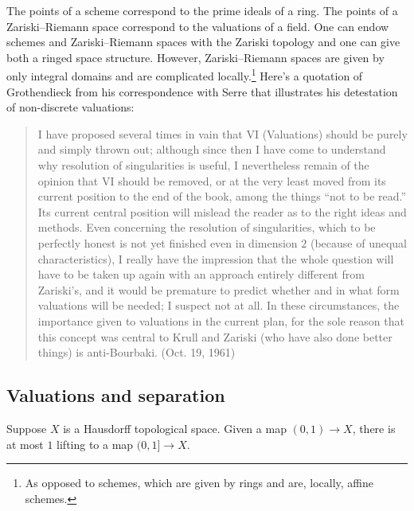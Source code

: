 \documentclass [11 pt, oneside] {article}
\begin{document}
The points of a scheme correspond to the prime ideals of a ring. The points of a Zariski--Riemann space correspond to the valuations of a field. One can endow schemes and Zariski--Riemann spaces with the Zariski topology and one can give both a ringed space structure. However, Zariski--Riemann spaces are given by only integral domains and are complicated locally.\footnote{As opposed to schemes, which are given by rings and are, locally, affine schemes.} Here's a quotation of Grothendieck from his correspondence with Serre that illustrates his detestation of non-discrete valuations:
\begin{quote}
	\small I have proposed several times in vain that VI (Valuations) should be purely and simply thrown out; although since then I have come to understand why resolution of singularities is useful, I nevertheless remain of the opinion that VI should be removed, or at the very least moved from its current position to the end of the book, among the things ``not to be read.'' Its current central position will mislead the reader as to the right ideas and methods. Even concerning the resolution of singularities, which to be perfectly honest is not yet finished even in dimension $2$ (because of unequal characteristics), I really have the impression that the whole question will have to be taken up again with an approach entirely different from Zariski's, and it would be premature to predict whether and in what form valuations will be needed; I suspect not at all. In these circumstances, the importance given to valuations in the current plan, for the sole reason that this concept was central to Krull and Zariski (who have also done better things) is anti-Bourbaki. (Oct. 19, 1961)
\end{quote}

\subsection{Valuations and separation}
Suppose $X$ is a Hausdorff topological space. Given a map $(0,1)\longrightarrow X$, there is at most $1$ lifting to a map $(0,1]\longrightarrow X$.
\end{document}
